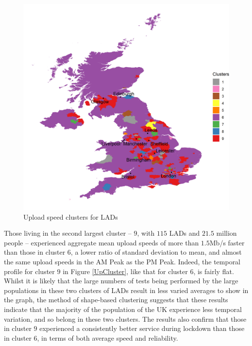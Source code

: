 \documentclass[]{interact}
\theoremstyle{plain}%
\theoremstyle{definition}
\theoremstyle{remark}
\begin{document}
\begin{figure}
\includegraphics[width=0.95\linewidth]{figures/map.up.clusters} \caption{\label{map.up.clusters}Upload speed clusters for LADs}\label{fig:unnamed-chunk-4}
\end{figure}

Those living in the second largest cluster -- \(9\), with \(115\) LADs
and \(21.5\) million people -- experienced aggregate mean upload speeds
of more than \(1.5\)Mb/s faster than those in cluster \(6\), a lower
ratio of standard deviation to mean, and almost the same upload speeds
in the AM Peak as the PM Peak. Indeed, the temporal profile for cluster
\(9\) in Figure \ref{UpCluster}, like that for cluster \(6\), is fairly
flat. Whilst it is likely that the large numbers of tests being
performed by the large populations in these two clusters of LADs result
in less varied averages to show in the graph, the method of shape-based
clustering suggests that these results indicate that the majority of the
population of the UK experience less temporal variation, and so belong
in these two clusters. The results also confirm that those in cluster
\(9\) experienced a consistently better service during lockdown than
those in cluster \(6\), in terms of both average speed and reliability.
\end{document}
